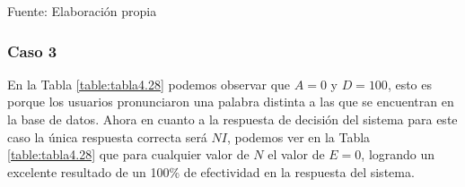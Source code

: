 \begin{center}
\begin{table}[H]
\centering
\caption{\small{Resultados para el caso 2 con U1 estático.}}
\label{table:tabla4.27}
\vskip 0.2cm
\begin{center}
\vskip 0.2cm
{\small{Fuente: Elaboración propia}}
\end{center}
\end{table}
\end{center}

\subsubsection{Caso 3}
En la Tabla \ref{table:tabla4.28} podemos observar que $A = 0$ y $D = 100$, esto es porque los usuarios pronunciaron una palabra distinta a las que se encuentran en la base de datos.
\vskip 0.5cm
Ahora en cuanto a la respuesta de decisión del sistema para este caso la única respuesta correcta será $NI$, podemos ver en la Tabla \ref{table:tabla4.28} que para cualquier valor de $N$ el valor de $E = 0$, logrando un excelente resultado de un 100\% de efectividad en la respuesta del sistema.

